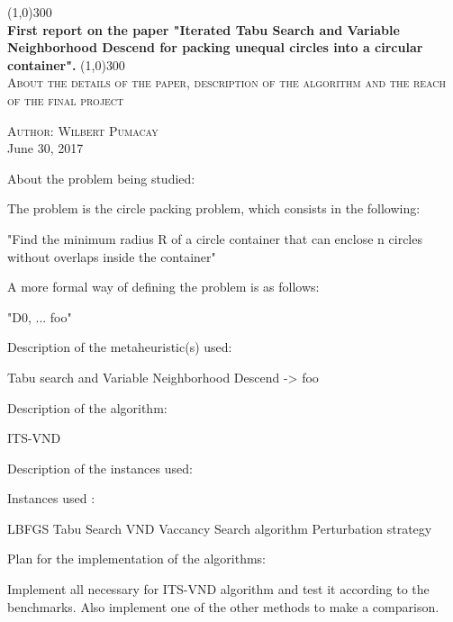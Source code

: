 \documentclass{article}
\begin{document}
\begin{titlepage}
	\begin{center}
	\line(1,0){300}\\
	\huge{\bfseries First report on the paper "Iterated Tabu Search and 		Variable Neighborhood Descend for packing unequal circles into a circular container".}
	\line(1,0){300}\\
	\textsc{\Large About the details of the paper, description of the algorithm and the reach of the final project}
	\end{center}
	
	\begin{flushright}
	\textsc{\large Author: Wilbert Pumacay\\}
	June 30, 2017
	\end{flushright}
	
\end{titlepage}



About the problem being studied:

The problem is the circle packing problem, which consists in the following:

"Find the minimum radius R of a circle container that can enclose n circles without overlaps inside the container"

A more formal way of defining the problem is as follows:

"D0, ... foo"


Description of the metaheuristic(s) used:

Tabu search and Variable Neighborhood Descend -> foo


Description of the algorithm:

ITS-VND

Description of the instances used:

Instances used :

LBFGS
Tabu Search
VND
Vaccancy Search algorithm
Perturbation strategy


Plan for the implementation of the algorithms:

Implement all necessary for ITS-VND algorithm and test it according to the benchmarks. Also implement one of the other methods to make a comparison.
\end{document}
